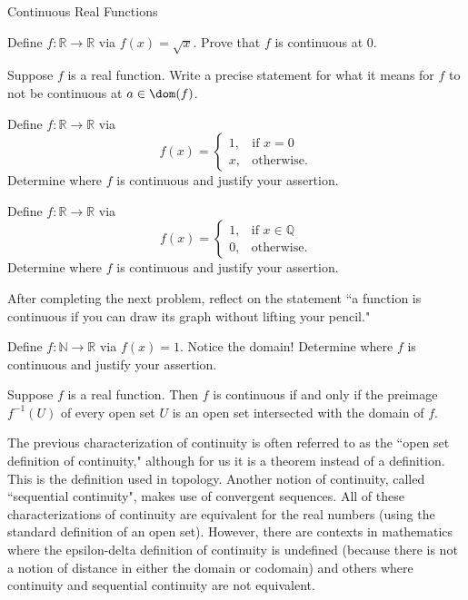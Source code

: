\begin{section}{Continuous Real Functions}
\begin{problem}
Define $f:\mathbb{R}\to\mathbb{R}$ via $f(x)=\sqrt{x}$. Prove that $f$ is continuous at 0.
\end{problem}

\begin{problem}
Suppose $f$ is a real function. Write a precise statement for what it means for $f$ to not be continuous at $a\in\dom(f)$.
\end{problem}

\begin{problem}
Define $f:\mathbb{R}\to\mathbb{R}$ via 
\[
f(x)=\begin{cases}
1, & \text{if }x=0\\
x, & \text{otherwise}.
\end{cases}
\]
Determine where $f$ is continuous and justify your assertion.
\end{problem}

\begin{problem}
Define $f:\mathbb{R}\to\mathbb{R}$ via 
\[
f(x)=\begin{cases}
1, & \text{if }x\in \mathbb{Q}\\
0, & \text{otherwise}.
\end{cases}
\]
Determine where $f$ is continuous and justify your assertion.
\end{problem}

After completing the next problem, reflect on the statement ``a function is continuous if you can draw its graph without lifting your pencil."

\begin{problem}
Define $f:\mathbb{N}\to\mathbb{R}$ via $f(x)=1$. Notice the domain! Determine where $f$ is continuous and justify your assertion.
\end{problem}

\begin{theorem}\label{thm:preimages open sets}
Suppose $f$ is a real function. Then $f$ is continuous if and only if the preimage $f^{-1}(U)$ of every open set $U$ is an open set intersected with the domain of $f$.
\end{theorem}

The previous characterization of continuity is often referred to as the ``open set definition of continuity," although for us it is a theorem instead of a definition. This is the definition used in topology. Another notion of continuity, called ``sequential continuity", makes use of convergent sequences.  All of these characterizations of continuity are equivalent for the real numbers (using the standard definition of an open set). However, there are contexts in mathematics where the epsilon-delta definition of continuity is undefined (because there is not a notion of distance in either the domain or codomain) and others where continuity and sequential continuity are not equivalent.


\end{section}
